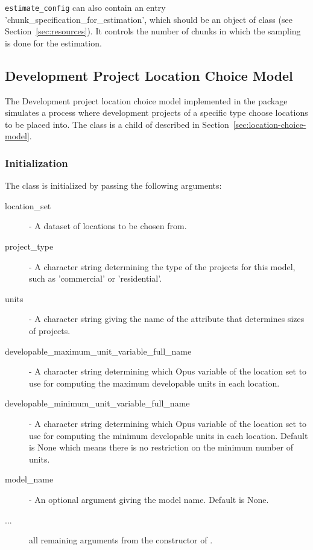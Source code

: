 \verb|estimate_config| can also contain an entry 'chunk_specification_for_estimation',
which should be an object of class  (see Section~\ref{sec:resources}).
It controls the number of chunks in which the sampling is done for the estimation.

%
%
\subsection{Development Project Location Choice Model}
\label{sec:development-project-lcm}
 
%
The Development project location choice model implemented in the
 package simulates a process where
development projects of a specific type choose locations to be placed into.
The class  is a child of
  described in
Section~\ref{sec:location-choice-model}.

\subsubsection{Initialization}
%
The class is initialized by passing the following arguments:
\begin{description}
\item[location_set] - A dataset of locations to be chosen from.
\item[project_type] - A character string determining the type of the projects
  for this model, such as 'commercial' or 'residential'. 
\item[units] - A character string giving the name of the attribute that
  determines sizes of projects.
\item[developable_maximum_unit_variable_full_name] -  A character string determining
  which Opus variable of the location set to use for computing the maximum developable units
  in each location.
\item[developable_minimum_unit_variable_full_name] -  A character string determining
  which Opus variable of the location set to use for computing the minimum developable units
  in each location. Default is None which means there is no restriction on the minimum number of units.
\item[model_name] - An optional argument giving the model name. Default is None.
\item[...] all remaining arguments from the constructor of
  . 
\end{description}

